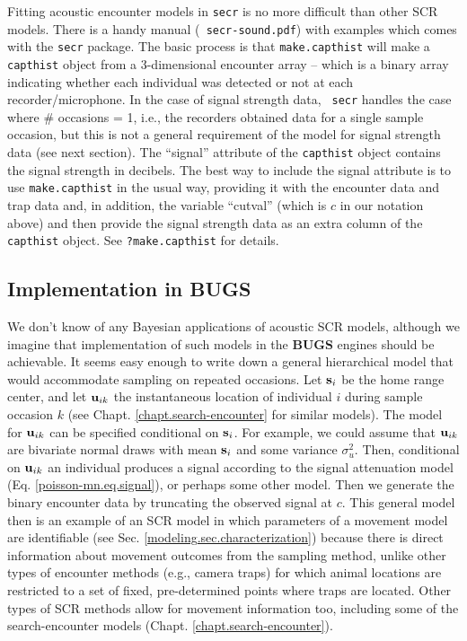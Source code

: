 Fitting acoustic encounter models in \mbox{\tt secr} is no more
difficult than other SCR models. There is a handy manual (\mbox{\tt
  secr-sound.pdf}) with examples \citep{efford_dawson:2010} which
comes with the \mbox{\tt secr} package.  The basic process is that
\mbox{\tt make.capthist} will make a \mbox{\tt capthist} object from a
3-dimensional encounter array -- which is a binary array indicating
whether each individual was detected or not at each
recorder/microphone. In the case of signal strength data, \mbox{\tt
  secr} handles the case where \# occasions = 1, i.e., the recorders
obtained data for a single sample occasion, but this is not a general
requirement of the model for signal strength data (see next section).
The ``signal'' attribute of the \mbox{\tt capthist} object contains
the signal strength in decibels.  The best way to include the signal
attribute is to use \mbox{\tt make.capthist} in the usual way,
providing it with the encounter data and trap data and, in addition,
the variable ``cutval'' (which is $c$ in our notation above) and then
provide the signal strength data as an extra column of the \mbox{\tt
  capthist} object.  See \mbox{\tt ?make.capthist} for details.



\subsection{Implementation in {\bf BUGS}}
\label{acoustic.bugs}

We don't know of any Bayesian applications of acoustic SCR models,
although we imagine that implementation of such models in the {\bf
  BUGS} engines should be achievable.  It seems easy enough to write
down a general hierarchical model that would accommodate sampling on
repeated occasions. Let ${\bf s}_{i}$ be the home range center, and
let ${\bf u}_{ik}$ the instantaneous location of individual $i$ during
sample occasion $k$ (see Chapt. \ref{chapt.search-encounter} for
similar models). The model for ${\bf u}_{ik}$ can be specified
conditional on ${\bf s}_{i}$. For example, we could assume that ${\bf
  u}_{ik}$ are bivariate normal draws with mean ${\bf s}_{i}$ and some
variance $\sigma_{u}^{2}$. Then, conditional on ${\bf u}_{ik}$ an
individual produces a signal according to the signal attenuation model
(Eq. \ref{poisson-mn.eq.signal}), or perhaps some other model. Then we
generate the binary encounter data by truncating the observed signal
at $c$. This general model then is an example of an SCR model in which
parameters of a movement model are identifiable (see
Sec. \ref{modeling.sec.characterization}) because there is direct
information about movement outcomes from the sampling method, unlike
other types of encounter methods (e.g., camera traps) for which animal
locations are restricted to a set of fixed, pre-determined points
where traps are located.  Other types of SCR methods allow for
movement information too, including some of the search-encounter
models (Chapt. \ref{chapt.search-encounter}).


